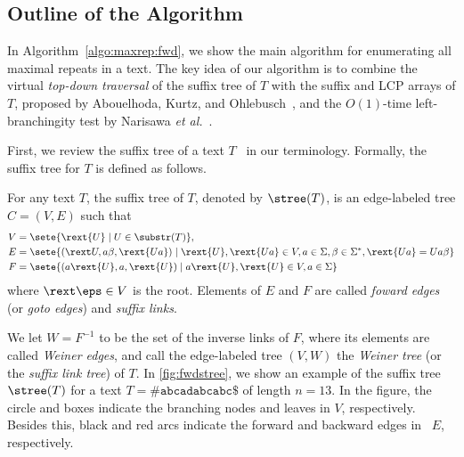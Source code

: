 \subsection{Outline of the Algorithm}
In Algorithm~\ref{algo:maxrep:fwd}, we show the main algorithm for enumerating all maximal repeats in a text. 
The key idea of our algorithm is to combine the virtual \textit{top-down traversal} of the suffix tree of $T$ with the suffix and LCP arrays of $T$, proposed by Abouelhoda, Kurtz, and Ohlebusch~\cite{abouelhoda2004replacing}, and the $O(1)$-time left-branchingity test by Narisawa \textit{et al.}~\cite{narisawa2007efficient}.


First, we review the suffix tree of a text $T$~\cite{gusfield1997algorithms} in our terminology.
Formally, the suffix tree for $T$ is defined as follows. 

\begin{definition}\rm
  \label{def:stree}
  For any text $T$, the suffix tree of $T$, denoted by $\stree(T)$, is an edge-labeled tree $C = (V, E)$ such that
  \begin{align*}
    V &= \sete{ \rext{U} \mid U \in \substr(T) },  
    \\
    E &=
    \sete{     (\rext U, a\beta, \rext{Ua})
      \mid \rext{U}, \rext{Ua} \in V, a\in\Sigma, \beta \in \Sigma^*,
      \rext{Ua} = U a\beta 
    }
    \\
    F &=
    \sete{ (a\rext{U}, a, \rext{U})
      \mid a\rext{U}, \rext{U} \in V, a\in\Sigma
    }
  \end{align*}
where $\rext\eps \in V$ is the root. Elements of $E$ and $F$ are called \textit{foward edges} (or \textit{goto edges}) and \textit{suffix links}. 
\end{definition}

We let $W = F^{-1}$ to be the set of the inverse links of $F$, where its elements are called \textit{Weiner edges}, and call the edge-labeled tree $(V, W)$ the \textit{Weiner tree} (or the \textit{suffix link tree}) of $T$. 
In \cref{fig:fwdstree}, we show an example of the suffix tree $\stree(T)$ for a text $T = \mathtt{\#abcadabcabc\$}$ of length $n = 13$. In the figure, the circle and boxes indicate the branching nodes and leaves in $V$, respectively. Besides this, black and red arcs indicate the forward and backward edges in~ $E$, respectively. 

